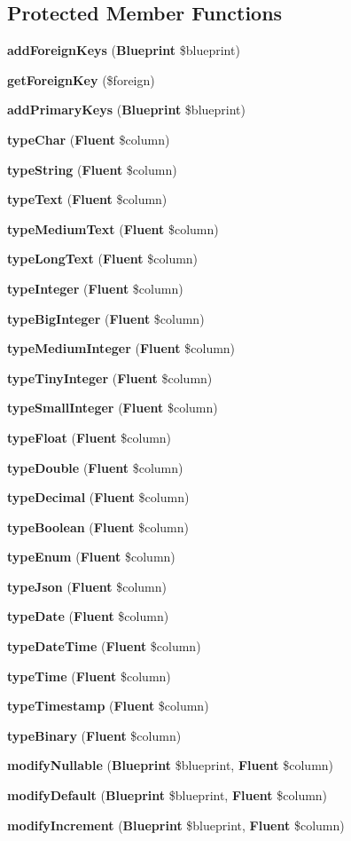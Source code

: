\subsection*{Protected Member Functions}
\begin{DoxyCompactItemize}
\item 
{\bf add\+Foreign\+Keys} ({\bf Blueprint} \$blueprint)
\item 
{\bf get\+Foreign\+Key} (\$foreign)
\item 
{\bf add\+Primary\+Keys} ({\bf Blueprint} \$blueprint)
\item 
{\bf type\+Char} ({\bf Fluent} \$column)
\item 
{\bf type\+String} ({\bf Fluent} \$column)
\item 
{\bf type\+Text} ({\bf Fluent} \$column)
\item 
{\bf type\+Medium\+Text} ({\bf Fluent} \$column)
\item 
{\bf type\+Long\+Text} ({\bf Fluent} \$column)
\item 
{\bf type\+Integer} ({\bf Fluent} \$column)
\item 
{\bf type\+Big\+Integer} ({\bf Fluent} \$column)
\item 
{\bf type\+Medium\+Integer} ({\bf Fluent} \$column)
\item 
{\bf type\+Tiny\+Integer} ({\bf Fluent} \$column)
\item 
{\bf type\+Small\+Integer} ({\bf Fluent} \$column)
\item 
{\bf type\+Float} ({\bf Fluent} \$column)
\item 
{\bf type\+Double} ({\bf Fluent} \$column)
\item 
{\bf type\+Decimal} ({\bf Fluent} \$column)
\item 
{\bf type\+Boolean} ({\bf Fluent} \$column)
\item 
{\bf type\+Enum} ({\bf Fluent} \$column)
\item 
{\bf type\+Json} ({\bf Fluent} \$column)
\item 
{\bf type\+Date} ({\bf Fluent} \$column)
\item 
{\bf type\+Date\+Time} ({\bf Fluent} \$column)
\item 
{\bf type\+Time} ({\bf Fluent} \$column)
\item 
{\bf type\+Timestamp} ({\bf Fluent} \$column)
\item 
{\bf type\+Binary} ({\bf Fluent} \$column)
\item 
{\bf modify\+Nullable} ({\bf Blueprint} \$blueprint, {\bf Fluent} \$column)
\item 
{\bf modify\+Default} ({\bf Blueprint} \$blueprint, {\bf Fluent} \$column)
\item 
{\bf modify\+Increment} ({\bf Blueprint} \$blueprint, {\bf Fluent} \$column)
\end{DoxyCompactItemize}
